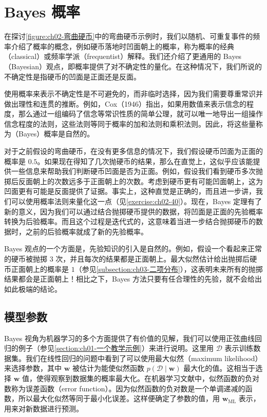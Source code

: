 \documentclass[../../main.tex]{subfiles}
\begin{document}
\section{Bayes 概率}\label{section:ch02-Bayes概率}

在探讨\cref{figure:ch02-弯曲硬币}中的弯曲硬币示例时，我们以随机、可重复事件的频率介绍了概率的概念，例如硬币落地时凹面朝上的概率，称为概率的经典（classical）或频率学派（frequentist）解释。我们还介绍了更通用的 Bayes（Bayesian）观点，即概率提供了对不确定性的量化。在这种情况下，我们所说的不确定性是指硬币的凹面是正面还是反面。

使用概率来表示不确定性是不可避免的，而非临时选择，因为我们需要尊重常识并做出理性和连贯的推断。例如，Cox（1946）指出，如果用数值来表示信念的程度，那么通过一组编码了信念等常识性质的简单公理，就可以唯一地导出一组操作信念程度的法则，这些法则等同于概率的加和法则和乘积法则。因此，将这些量称为（Bayes）概率是自然的。

对于之前假设的弯曲硬币，在没有更多信息的情况下，我们假设硬币凹面为正面的概率是 $0.5$。如果现在得知了几次抛硬币的结果，那么在直觉上，这似乎应该能提供一些信息来帮助我们判断硬币凹面是否为正面。例如，假设我们看到硬币多次抛掷后反面朝上的次数远多于正面朝上的次数。考虑到硬币更有可能凹面朝上，这为凹面更有可能是反面提供了证据。事实上，这种直觉是正确的，而且进一步讲，我们可以使用概率法则来量化这一点（见\cref{exercise:ch02-40}）。现在，Bayes 定理有了新的意义，因为我们可以通过结合抛掷硬币提供的数据，将凹面是正面的先验概率转换为后验概率。而且这个过程是迭代式的，这意味着当进一步结合抛掷硬币的数据时，之前的后验概率就成了新的先验概率。

Bayes 观点的一个方面是，先验知识的引入是自然的。例如，假设一个看起来正常的硬币被抛掷 $3$ 次，并且每次的结果都是正面朝上。最大似然估计给出抛掷后硬币正面朝上的概率是 $1$（参见\cref{subsection:ch03-二项分布}），这表明未来所有的抛掷结果都会是正面朝上！相比之下，Bayes 方法只要有任合理性的先验，就不会给出如此极端的结论。

\subsection{模型参数}\label{subsection:ch02-模型参数}

Bayes 视角为机器学习的多个方面提供了有价值的见解，我们可以使用正弦曲线回归的例子（参见\cref{section:ch01-一个教学示例}）来进行说明。这里用 $\mathcal{D}$ 表示训练数据集。我们在线性回归的问题中看到了可以使用最大似然（maximum likelihood）来选择参数，其中 $\mathbf{w}$ 被估计为能使似然函数 $p(\mathcal{D}\mid\mathbf{w})$ 最大化的值。这相当于选择 $\mathbf{w}$ 值，使得观察到数据集的概率最大化。在机器学习文献中，似然函数的负对数称为误差函数（error function）。因为似然函数的负对数是一个单调递减的函数，所以最大化似然等同于最小化误差。这样便确定了参数的值，用 $\mathbf{w}_{\mathrm{ML}}$ 表示，用来对新数据进行预测。
\end{document}
